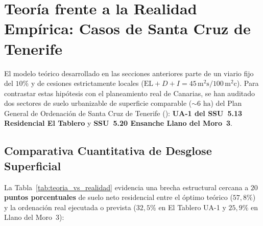 \section{Teoría frente a la Realidad Empírica: Casos de Santa Cruz de Tenerife}
\label{sec:teoria_realidad}

El modelo teórico desarrollado en las secciones anteriores parte de un viario fijo del $10\%$ y de cesiones estrictamente locales ($\text{EL}+D+I = 45\,\text{m}^2\text{s}/100\,\text{m}^2\text{c}$). Para contrastar estas hipótesis con el planeamiento real de Canarias, se han auditado dos sectores de suelo urbanizable de superficie comparable ($\sim 6\text{ ha}$) del Plan General de Ordenación de Santa Cruz de Tenerife (\cite{pgou_santacruz_2005,sitcan_planeamiento_2026}): \textbf{UA-1 del SSU~5.13 Residencial El Tablero} y \textbf{SSU~5.20 Ensanche Llano del Moro~3}.

\subsection{Comparativa Cuantitativa de Desglose Superficial}

La Tabla~\ref{tab:teoria_vs_realidad} evidencia una brecha estructural cercana a \textbf{$20$ puntos porcentuales} de suelo neto residencial entre el óptimo teórico ($57{,}8\%$) y la ordenación real ejecutada o prevista ($32{,}5\%$ en El Tablero UA-1 y $25{,}9\%$ en Llano del Moro~3):

